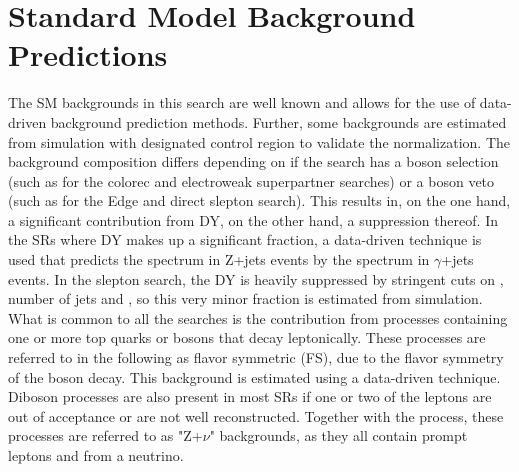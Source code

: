 \chapter{Standard Model Background Predictions}\label{sec:backgrounds}
\noindent
\justify
The SM backgrounds in this search are well known and allows for the use of data-driven background prediction methods. 
Further, some backgrounds are estimated from simulation with designated control region to validate the normalization. 
The background composition differs depending on if the search has a \PZ boson selection (such as for the colorec and electroweak superpartner searches) or a \PZ boson veto (such as for the Edge and direct slepton search). 
This results in, on the one hand, a significant contribution from DY, on the other hand, a suppression thereof. 
In the SRs where DY makes up a significant fraction, a data-driven technique is used that predicts the \ptmiss spectrum in Z+jets events by the \ptmiss spectrum in $\gamma$+jets events. 
In the slepton search, the DY is heavily suppressed by stringent cuts on \ptmiss, number of jets and \mttwo, so this very minor fraction is estimated from simulation.  
What is common to all the searches is the contribution from processes containing one or more top quarks or \PW bosons that decay leptonically. 
These processes are referred to in the following as flavor symmetric (FS), due to the flavor symmetry of the \PW boson decay. 
This background is estimated using a data-driven technique. 
Diboson processes are also present in most SRs if one or two of the leptons are out of acceptance or are not well reconstructed. 
Together with the \ttZ process, these processes are referred to as "Z+$\nu$" backgrounds, as they all contain prompt leptons and \ptmiss from a neutrino.   
